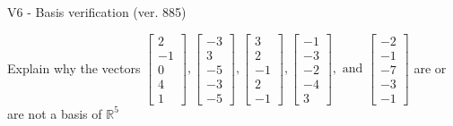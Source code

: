 \begin{exercise}
  \begin{exerciseTitle}V6 - Basis verification (ver. 885)\end{exerciseTitle}
  \begin{exerciseStatement}
    Explain why the vectors \(\left[\begin{array}{r}
2 \\
-1 \\
0 \\
4 \\
1
\end{array}\right] , \left[\begin{array}{r}
-3 \\
3 \\
-5 \\
-3 \\
-5
\end{array}\right] , \left[\begin{array}{r}
3 \\
2 \\
-1 \\
2 \\
-1
\end{array}\right] , \left[\begin{array}{r}
-1 \\
-3 \\
-2 \\
-4 \\
3
\end{array}\right] , \text{ and } \left[\begin{array}{r}
-2 \\
-1 \\
-7 \\
-3 \\
-1
\end{array}\right]\) are or are not a basis of \(\mathbb{R}^5\)	



\end{exerciseStatement}
\end{exercise}
